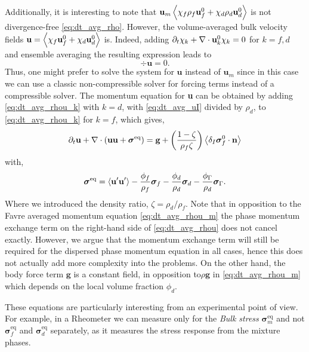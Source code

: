 Additionally, it is interesting to note that $\textbf{u}_m \left<\chi_f\rho_f \textbf{u}_f^0 + \chi_d \rho_d \textbf{u}_d^0\right> $ is not divergence-free \eqref{eq:dt_avg_rho}. 
However,  the volume-averaged bulk velocity fields $\textbf{u} = \left<\chi_f \textbf{u}_f^0 + \chi_d \textbf{u}_d^0\right> $ is. 
Indeed, adding $\partial_t \chi_k + \mathbf{\nabla}\cdot \textbf{u}_k^0\chi_k =0$ for $k=f,d$ and ensemble averaging the resulting expression leads to 
\begin{equation}
    \div\textbf{u}=0.
\end{equation}
Thus, one might prefer to solve the system for $\textbf{u}$ instead of $\textbf{u}_m$ since in this case we can use a classic non-compressible solver for forcing terms instead of a compressible solver. 
The momentum equation for \textbf{u} can be obtained by adding \ref{eq:dt_avg_rhou_k} with $k=d$, with \ref{eq:dt_avg_uI} divided by $\rho_d$, to \ref{eq:dt_avg_rhou_k} for $k=f$, which gives, 
\begin{equation}
    \pddt \textbf{u}  
    + \div (
        \textbf{u}\textbf{u}
        + \bm{\sigma}^\text{eq}
    )
    = 
    \textbf{g} 
    + \left(\frac{1-\zeta}{\rho_f\zeta}\right) \avg{\delta_I \bm{\sigma}_f^0 \cdot \textbf{n}} 
    \label{eq:dt_avg_rhou}
\end{equation}
with, 
\begin{equation}
    \bm\sigma^\text{eq} = 
    \left< \textbf{u}'\textbf{u}'\right>
    - \frac{\phi_f}{\rho_f}\bm\sigma_f
    - \frac{\phi_d}{\rho_d}\bm\sigma_d
    - \frac{\phi_\Gamma}{\rho_d} \bm\sigma_\Gamma. 
\end{equation}
Where we introduced the density ratio, $\zeta = \rho_d  / \rho_f$. 
Note that in opposition to the Favre averaged momentum equation \eqref{eq:dt_avg_rhou_m} the phase momentum exchange term on the right-hand side of \ref{eq:dt_avg_rhou} does not cancel exactly. 
However, we argue that the momentum exchange term will still be required for the dispersed phase momentum equation in all cases, hence this does not actually add more complexity into the problems.
On the other hand, the body force term $\textbf{g}$ is a constant field, in opposition to$\rho \textbf{g}$ in \eqref{eq:dt_avg_rhou_m} which depends on the local volume fraction $\phi_d$. 


These equations are particularly interesting from an experimental point of view. 
For example, in a Rheometer we can measure only for the \textit{Bulk stress} $\bm\sigma^\text{eq}_m$ and not $\bm\sigma^\text{eq}_f$ and $\bm\sigma^\text{eq}_d$ separately, as it measures the stress response from the mixture phases. 

